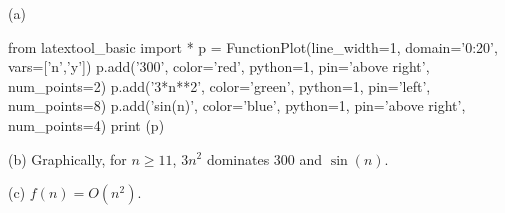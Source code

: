 (a)
\begin{python}
from latextool_basic import *
p = FunctionPlot(line_width=1, domain='0:20', vars=['n','y'])
p.add('300', color='red', python=1, pin='above right', num_points=2)
p.add('3*n**2', color='green', python=1, pin='left', num_points=8)
p.add('sin(n)', color='blue', python=1, pin='above right', num_points=4)
print (p)
\end{python}

(b)
Graphically, for $n \geq 11$,
$3n^2$ dominates $300$ and $\sin(n)$.

(c)
$f(n) = O(n^2)$.

